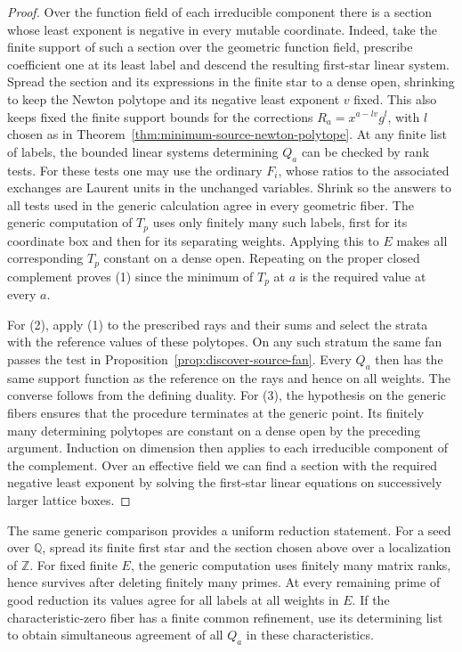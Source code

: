 \documentclass[11pt,reqno]{amsart}
\numberwithin{equation}{section}
\theoremstyle{definition}
\theoremstyle{remark}
\begin{document}
\begin{proof}
Over the function field of each irreducible component there is a section
whose least exponent is negative in every mutable coordinate. Indeed, take
the finite support of such a section over the geometric function field, prescribe coefficient one
at its least label and descend the resulting first-star linear
system. Spread the section and its expressions in the finite star
to a dense open, shrinking to keep the Newton polytope and its
negative least exponent \(v\) fixed. This also keeps fixed the finite
support bounds for the corrections \(R_a=x^{a-lv}g^l\), with \(l\) chosen
as in Theorem~\ref{thm:minimum-source-newton-polytope}. At any finite
list of labels, the bounded linear systems determining \(Q_a\) can be
checked by rank tests. For these tests one may use the ordinary \(F_i\),
whose ratios to the associated exchanges are Laurent units in the
unchanged variables. Shrink so the answers to all tests used in the
generic calculation agree in every geometric fiber. The generic
computation of \(T_p\) uses only finitely many such labels, first for
its coordinate box and then for its separating weights. Applying
this to \(E\) makes all corresponding \(T_p\) constant on a dense
open. Repeating on the proper closed complement proves (1) since
the minimum of \(T_p\) at \(a\) is the required value at every \(a\).

For (2), apply (1) to the prescribed rays and their sums and select
the strata with the reference values of these polytopes. On any
such stratum the same fan passes the test in
Proposition~\ref{prop:discover-source-fan}. Every \(Q_a\) then has
the same support function as the reference on the rays and hence
on all weights. The converse follows from the defining duality.
For (3), the hypothesis on the generic fibers ensures that the
procedure terminates at the generic point. Its finitely many
determining polytopes are constant on a dense open by the preceding
argument. Induction on dimension then applies to each irreducible
component of the complement. Over an effective field we can find a
section with the required negative least exponent by solving the
first-star linear equations on successively larger lattice boxes.
\end{proof}

The same generic comparison provides a uniform reduction statement.
For a seed over \(\mathbb Q\), spread its finite first star and the
section chosen above over a localization of \(\mathbb Z\).
For fixed finite \(E\), the generic computation uses finitely many
matrix ranks, hence survives after deleting finitely many primes.
At every remaining prime of good reduction its values agree for all
labels at all weights in \(E\). If the characteristic-zero fiber
has a finite common refinement, use its determining list to obtain
simultaneous agreement of all \(Q_a\) in these characteristics.
\end{document}
